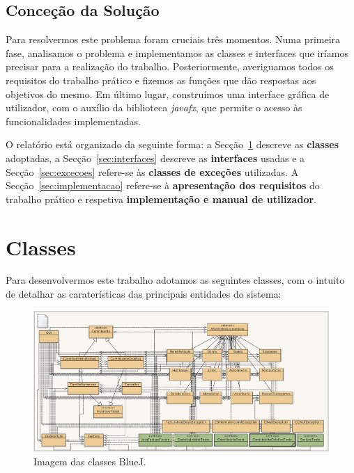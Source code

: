 \documentclass[a4paper]{article}
\begin{document}
\subsection{Conceção da Solução}
\label{sec:solucao}

Para resolvermos este problema foram cruciais três momentos. Numa primeira fase,
analisamos o problema e implementamos as classes e interfaces que iríamos
precisar para a realização do trabalho. Posteriormente, averiguamos todos os requisitos
do trabalho prático e fizemos as funções que dão respostas aos objetivos do mesmo.
Em último lugar, construímos uma interface gráfica de utilizador, com o auxílio da biblioteca
\emph{javafx}, que permite o acesso às funcionalidades implementadas.

O relatório está organizado da seguinte forma: a
Secção~\ref{sec:classes} descreve as \textbf{classes} adoptadas,
a Secção~\ref{sec:interfaces} descreve as \textbf{interfaces}
usadas e a Secção~\ref{sec:excecoes} refere-se às
\textbf{classes de exceções} utilizadas. A Secção~\ref{sec:implementacao}
refere-se à \textbf{apresentação dos requisitos} do trabalho prático e respetiva
\textbf{implementação e manual de utilizador}.



\section{Classes}
\label{sec:classes}

Para desenvolvermos este trabalho adotamos as seguintes classes, com o intuito de
detalhar as caraterísticas das principais entidades do sistema:

\begin{figure}[H]
\centering
\includegraphics[scale=0.35]{imgs/classesbluej.png}
\caption{Imagem das classes BlueJ.}
\label{img:classesbluej}
\end{figure}
\end{document}
